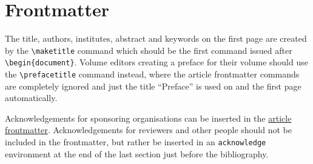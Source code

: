 \documentclass{eceasst}
\begin{document}
\section{Frontmatter}\label{front}

The %
title, authors, institutes, abstract and keywords on the
first page are created by the \verb|\maketitle| command which should be the
first command issued after \verb|\begin{document}|.
Volume editors creating a preface for their volume should use the
\verb|\prefacetitle| command instead, where the article frontmatter commands
are completely ignored and just the title ``Preface'' is used on %
and the first page automatically.

Acknowledgements for sponsoring organisations can be inserted in the
\hyperref[artfront]{article frontmatter}.
Acknowledgements for reviewers and other people should not be included in the
frontmatter, but rather be inserted in an \verb|acknowledge| environment at
the end of the last section just before the bibliography.
\end{document}

